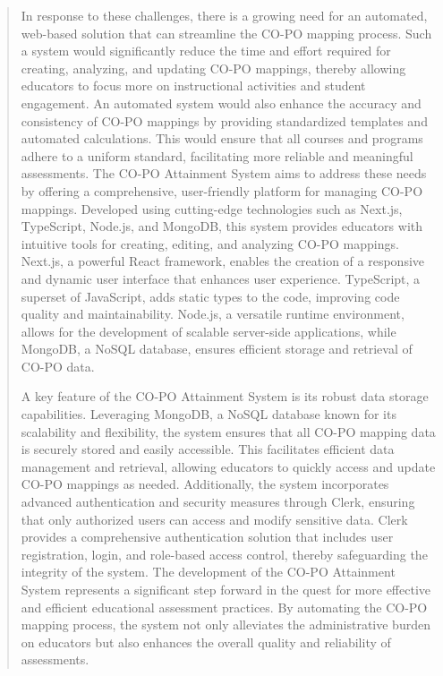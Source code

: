 \documentclass[12pt]{report}
\begin{document}
\begin{quote}
		
		\hspace{1cm}In response to these challenges, there is a growing need for an automated, web-based solution that can streamline the CO-PO mapping process. Such a system would significantly reduce the time and effort required for creating, analyzing, and updating CO-PO mappings, thereby allowing educators to focus more on instructional activities and student engagement. An automated system would also enhance the accuracy and consistency of CO-PO mappings by providing standardized templates and automated calculations. This would ensure that all courses and programs adhere to a uniform standard, facilitating more reliable and meaningful assessments.
		The CO-PO Attainment System aims to address these needs by offering a comprehensive, user-friendly platform for managing CO-PO mappings. Developed using cutting-edge technologies such as Next.js, TypeScript, Node.js, and MongoDB, this system provides educators with intuitive tools for creating, editing, and analyzing CO-PO mappings. Next.js, a powerful React framework, enables the creation of a responsive and dynamic user interface that enhances user experience. TypeScript, a superset of JavaScript, adds static types to the code, improving code quality and maintainability. Node.js, a versatile runtime environment, allows for the development of scalable server-side applications, while MongoDB, a NoSQL database, ensures efficient storage and retrieval of CO-PO data.
		
		
		A key feature of the CO-PO Attainment System is its robust data storage capabilities. Leveraging MongoDB, a NoSQL database known for its scalability and flexibility, the system ensures that all CO-PO mapping data is securely stored and easily accessible. This facilitates efficient data management and retrieval, allowing educators to quickly access and update CO-PO mappings as needed. Additionally, the system incorporates advanced authentication and security measures through Clerk, ensuring that only authorized users can access and modify sensitive data. Clerk provides a comprehensive authentication solution that includes user registration, login, and role-based access control, thereby safeguarding the integrity of the system.
		The development of the CO-PO Attainment System represents a significant step forward in the quest for more effective and efficient educational assessment practices. By automating the CO-PO mapping process, the system not only alleviates the administrative burden on educators but also enhances the overall quality and reliability of assessments.
		

\end{quote}
\end{document}
